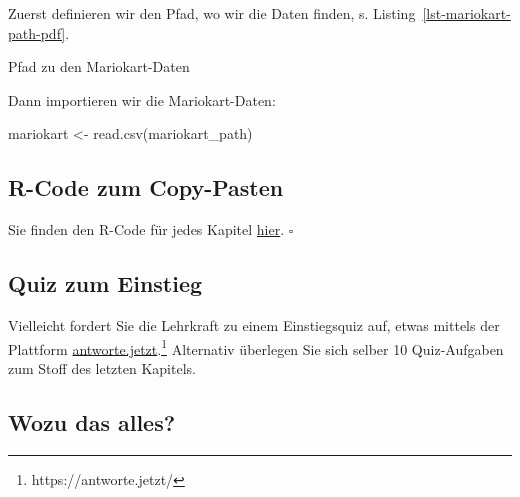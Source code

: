 \documentclass[
  a4paper,
  DIV=11]{scrreprt}
\newenvironment{Shaded}{\begin{snugshade}}{\end{snugshade}}
\newcommand{\FunctionTok}[1]{\textcolor[rgb]{0.28,0.35,0.67}{#1}}
\newcommand{\NormalTok}[1]{\textcolor[rgb]{0.00,0.23,0.31}{#1}}
\newcommand{\OtherTok}[1]{\textcolor[rgb]{0.00,0.23,0.31}{#1}}
\newcommand{\StringTok}[1]{\textcolor[rgb]{0.13,0.47,0.30}{#1}}
\theoremstyle{definition}
\theoremstyle{definition}
\theoremstyle{definition}
\theoremstyle{remark}
\begin{document}
Zuerst definieren wir den Pfad, wo wir die Daten finden, s.
Listing~\ref{lst-mariokart-path-pdf}.

\begin{codelisting}

\caption{\label{lst-mariokart-path-pdf}Pfad zu den Mariokart-Daten}

\centering{

\begin{Shaded}
\begin{Highlighting}[]
\NormalTok{mariokart\_path }\OtherTok{\textless{}{-}} \FunctionTok{paste0}\NormalTok{(}
  \StringTok{"https://vincentarelbundock.github.io/Rdatasets"}\NormalTok{,}
  \StringTok{"/csv/openintro/mariokart.csv"}\NormalTok{)}
\end{Highlighting}
\end{Shaded}

}

\end{codelisting}%

Dann importieren wir die Mariokart-Daten:

\begin{Shaded}
\begin{Highlighting}[]
\NormalTok{mariokart }\OtherTok{\textless{}{-}} \FunctionTok{read.csv}\NormalTok{(mariokart\_path)}
\end{Highlighting}
\end{Shaded}

\subsection{R-Code zum Copy-Pasten}\label{r-code-zum-copy-pasten-1}

Sie finden den R-Code für jedes Kapitel
\href{https://github.com/sebastiansauer/statistik1/tree/main/R-code-for-all-chapters}{hier}.
\(\square\)

\subsection{Quiz zum Einstieg}\label{quiz-zum-einstieg}

Vielleicht fordert Sie die Lehrkraft zu einem Einstiegsquiz auf, etwas
mittels der Plattform
\href{https://antworte.jetzt/}{antworte.jetzt}.\footnote{https://antworte.jetzt/}
Alternativ überlegen Sie sich selber 10 Quiz-Aufgaben zum Stoff des
letzten Kapitels.

\subsection{Wozu das alles?}\label{wozu-das-alles}
\end{document}
